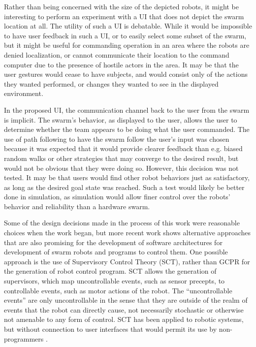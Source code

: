 Rather than being concerned with the size of the depicted robots, it might be interesting to perform an experiment with a UI that does not depict the swarm location at all. 
The utility of such a UI is debatable.
While it would be impossible to have user feedback in such a UI, or to easily select some subset of the swarm, but it might be useful for commanding operation in an area where the robots are denied localization, or cannot communicate their location to the command computer due to the presence of hostile actors in the area. 
It may be that the user gestures would cease to have subjects, and would consist only of the actions they wanted performed, or changes they wanted to see in the displayed environment. 
	
In the proposed UI, the communication channel back to the user from the swarm is implicit. 
The swarm's behavior, as displayed to the user, allows the user to determine whether the team appears to be doing what the user commanded. 
The use of path following to have the swarm follow the user's input was chosen because it was expected that it would provide clearer feedback than e.g. biased random walks or other strategies that may converge to the desired result, but would not be obvious that they were doing so. 
However, this decision was not tested. 
It may be that users would find other robot behaviors just as satisfactory, as long as the desired goal state was reached. 
Such a test would likely be better done in simulation, as simulation would allow finer control over the robots' behavior and reliability than a hardware swarm. 

Some of the design decisions made in the process of this work were reasonable choices when the work began, but more recent work shows alternative approaches that are also promising for the development of software architectures for development of swarm robots and programs to control them.
One possible approach is the use of Supervisory Control Theory (SCT), rather than GCPR for the generation of robot control program. 
SCT allows the generation of supervisors, which map uncontrollable events, such as sensor precepts, to controllable events, such as motor actions of the robot. 
The ``uncontrollable events'' are only uncontrollable in the sense that they are outside of the realm of events that the robot can directly cause, not necessarily stochastic or otherwise not amenable to any form of control. 
SCT has been applied to robotic systems, but without connection to user interfaces that would permit its use by non-programmers \citep{lopes2014application, lopes2016supervisory}.

